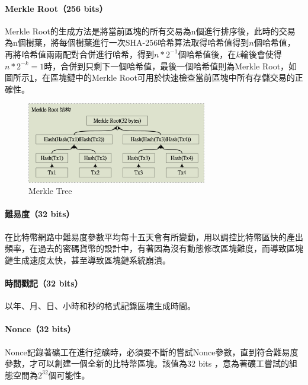 			\paragraph{Merkle Root（256 bits）}Merkle Root的生成方法是將當前區塊的所有交易為n個進行排序後，此時的交易為n個樹葉，將每個樹葉進行一次SHA-256哈希算法取得哈希值得到$n$個哈希值，再將哈希值兩兩配對合併進行哈希，得到$n*2^{-1}$個哈希值後，在$k$輪後會使得$n*2^{-k}=1$時，合併到只剩下一個哈希值，最後一個哈希值則為Merkle Root，如圖所示\ref{MerkleRoot}，在區塊鏈中的Merkle Root可用於快速檢查當前區塊中所有存儲交易的正確性。

			\begin{figure}[h]
				\centering
				\includegraphics[width = 0.7\textwidth]{MerkleRoot.png}
				\caption{Merkle Tree}\label{MerkleRoot}
			\end{figure}

			\paragraph{難易度（32 bits）}在比特幣網路中難易度參數平均每十五天會有所變動，用以調控比特幣區快的產出頻率，在過去的密碼貨幣的設計中，有著因為沒有動態修改區塊難度，而導致區塊鏈生成速度太快，甚至導致區塊鏈系統崩潰。
			\paragraph{時間戳記（32 bits）}以年、月、日、小時和秒的格式記錄區塊生成時間。
			\paragraph{Nonce（32 bits）}Nonce記錄著礦工在進行挖礦時，必須要不斷的嘗試Nonce參數，直到符合難易度參數，才可以創建一個全新的比特幣區塊。該值為32 bits ，意為著礦工嘗試的組態空間為$2^{32}$個可能性。


